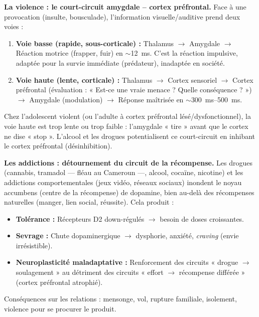 \documentclass[11pt]{article}
\newcommand{\cle}[1]{{\popxbold\color{popdark}#1}}
\begin{document}
\textbf{La violence : le court-circuit amygdale -- cortex préfrontal.}
Face à une provocation (insulte, bousculade), l'information visuelle/auditive prend deux voies :
\begin{enumerate}
  \item \textbf{Voie basse (rapide, sous-corticale) :} Thalamus $\rightarrow$ Amygdale $\rightarrow$ Réaction motrice (frapper, fuir) en $\sim$\SI{12}{ms}. C'est la \cle{réaction impulsive}, adaptée pour la survie immédiate (prédateur), inadaptée en société.
  \item \textbf{Voie haute (lente, corticale) :} Thalamus $\rightarrow$ Cortex sensoriel $\rightarrow$ Cortex préfrontal (évaluation : « Est-ce une vraie menace ? Quelle conséquence ? ») $\rightarrow$ Amygdale (modulation) $\rightarrow$ \cle{Réponse maîtrisée} en $\sim$\SI{300}{ms}--\SI{500}{ms}.
\end{enumerate}
Chez l'adolescent violent (ou l'adulte à cortex préfrontal lésé/dysfonctionnel), la voie haute est trop lente ou trop faible : l'amygdale « tire » avant que le cortex ne dise « stop ». L'alcool et les drogues potentialisent ce court-circuit en inhibant le cortex préfrontal (désinhibition).

\textbf{Les addictions : détournement du circuit de la récompense.}
Les drogues (cannabis, tramadol — fléau au Cameroun —, alcool, cocaïne, nicotine) et les addictions comportementales (jeux vidéo, réseaux sociaux) inondent le \cle{noyau accumbens} (centre de la récompense) de \cle{dopamine}, bien au-delà des récompenses naturelles (manger, lien social, réussite). Cela produit :
\begin{itemize}
  \item \textbf{Tolérance :} Récepteurs D2 down-régulés $\rightarrow$ besoin de doses croissantes.
  \item \textbf{Sevrage :} Chute dopaminergique $\rightarrow$ dysphorie, anxiété, \emph{craving} (envie irrésistible).
  \item \textbf{Neuroplasticité maladaptative :} Renforcement des circuits « drogue $\rightarrow$ soulagement » au détriment des circuits « effort $\rightarrow$ récompense différée » (cortex préfrontal atrophié).
\end{itemize}
Conséquences sur les relations : mensonge, vol, rupture familiale, isolement, violence pour se procurer le produit.
\end{document}

